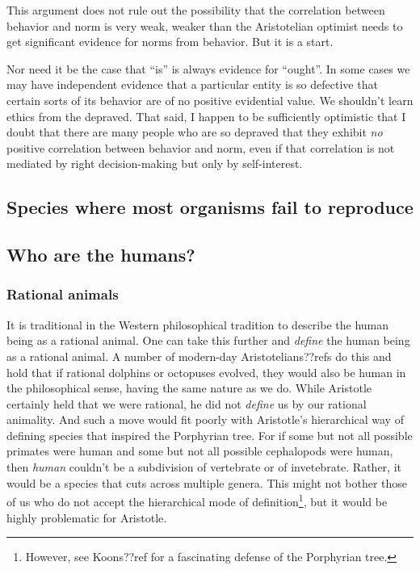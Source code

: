 This argument does not rule out the possibility that the correlation between behavior and norm is very weak, weaker than the Aristotelian
optimist needs to get significant evidence for norms from behavior. But it is a start.

Nor need it be the case that ``is'' is always evidence for ``ought''. In some cases we may have independent evidence that a particular
entity is so defective that certain sorts of its behavior are of no positive evidential value. We shouldn't learn ethics from the 
depraved. That said, I happen to be sufficiently optimistic that I doubt that there are many people who are so depraved that they exhibit
\textit{no} positive correlation between behavior and norm, even if that correlation is not mediated by right decision-making but only
by self-interest.

\subsection{Species where most organisms fail to reproduce}

\subsection{Who are the humans?}
\subsubsection{Rational animals}
It is traditional in the Western philosophical tradition to describe the human being as a rational animal. One can
take this further and \textit{define} the human being as a rational animal. A number of modern-day Aristotelians??refs do this
and hold that if rational dolphins or octopuses evolved, they would also be human in the philosophical sense, having the 
same nature as we do. While Aristotle certainly held that we were rational, he did not \textit{define} us by our rational animality.
And such a move would fit poorly with Aristotle's hierarchical
way of defining species that inspired the Porphyrian tree. For if some but not all possible primates were human and some 
but not all possible cephalopods were human, then \textit{human} couldn't be a subdivision of vertebrate or of invetebrate. Rather, 
it would be a species that cuts across multiple genera. This might not bother those of us who do not accept the hierarchical
mode of definition\footnote{However, see Koons??ref for a fascinating defense of the Porphyrian tree.}, but it would be 
highly problematic for Aristotle. 

